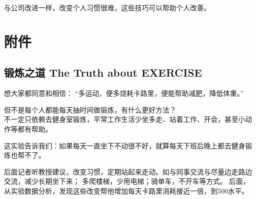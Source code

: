 与公司改进一样，改变个人习惯很难，这些技巧可以帮助个人改善。

\hypertarget{ux9644ux4ef6}{%
\section{附件}\label{ux9644ux4ef6}}


\hypertarget{ux953bux70bcux4e4bux9053-the-truth-about-exercise}{%
\subsection{锻炼之道 The Truth about
EXERCISE}\label{ux953bux70bcux4e4bux9053-the-truth-about-exercise}}

想大家都同意和相信：
``多运动，便多烧耗卡路里，便能帮助减肥，降低体重。''



但不是每个人都能每天抽时间做锻炼，有什么更好方法？\\
不一定只依赖去健身室锻炼，平常工作生活少坐多走、站着工作、开会，甚至小动作等都有帮助。


这实验告诉我们：如果每天一直坐下不动很不好，就算每天下班后晚上都去健身锻炼也帮不了。

后面记者听教授建议，改变习惯，定期站起来走动。如与同事交流与尽量边走路边交流，减少长期坐下来；
多爬楼梯，少用电梯；骑单车，不开车等方式。
后面，从实验数据分析，发现这些改变帮他增加每天卡路里消耗接近一倍，到500水平。

